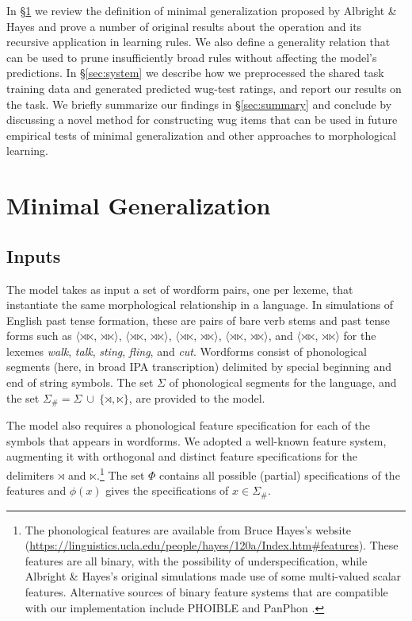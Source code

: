 \documentclass[11pt]{article}
\begin{document}
In \S\ref{sec:mingen} we review the definition of minimal generalization proposed by Albright \& Hayes and prove a number of original results about the operation and its recursive application in learning rules. We also define a generality relation that can be used to prune insufficiently broad rules without affecting the model's predictions. In \S\ref{sec:system} we describe how we preprocessed the shared task training data and generated predicted wug-test ratings, and report our results on the  task. We briefly summarize our findings in \S\ref{sec:summary} and conclude by discussing a novel method for constructing wug items that can be used in future empirical tests of minimal generalization and other approaches to morphological learning.

\section{Minimal Generalization}
\label{sec:mingen}

\subsection{Inputs}

The model takes as input a set of wordform pairs, one per lexeme, that instantiate the same morphological relationship in a language. In simulations of English past tense formation, these are pairs of bare verb stems and past tense forms such as $\langle$$\rtimes$$\ltimes$, $\rtimes$$\ltimes$$\rangle$, $\langle$$\rtimes$$\ltimes$, $\rtimes$$\ltimes$$\rangle$, $\langle$$\rtimes$$\ltimes$, $\rtimes$$\ltimes$$\rangle$, $\langle$$\rtimes$$\ltimes$, $\rtimes$$\ltimes$$\rangle$, and $\langle$$\rtimes$$\ltimes$, $\rtimes$$\ltimes$$\rangle$ for the lexemes \textit{walk}, \textit{talk}, \textit{sting}, \textit{fling}, and \textit{cut}. Wordforms consist of phonological segments (here, in broad IPA transcription) delimited by special beginning and end of string symbols. The set $\Sigma$ of phonological segments for the language, and the set $\Sigma_{\#} = \Sigma \ \cup \ \{ \rtimes, \ltimes \}$, are provided to the model.

The model also requires a phonological feature specification for each of the symbols that appears in wordforms. We adopted a well-known feature system, augmenting it with orthogonal and distinct feature specifications for the delimiters $\rtimes$ and $\ltimes$.\footnote{The phonological features are available from Bruce Hayes's website (\url{https://linguistics.ucla.edu/people/hayes/120a/Index.htm\#features}). These features are all binary, with the possibility of underspecification, while Albright \& Hayes's original simulations made use of some multi-valued scalar features. Alternative sources of binary feature systems that are compatible with our implementation include PHOIBLE \citep{moran2014} and PanPhon \citep{mortensen-etal-2016-panphon}.} The set $\Phi$ contains all possible (partial) specifications of the features and $\phi(x)$ gives the specifications of $x \in \Sigma_{\#}$.
\end{document}
